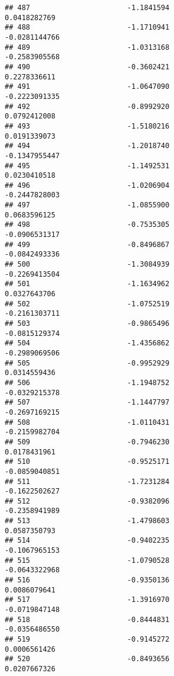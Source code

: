 \documentclass[
]{article}
\begin{document}
\begin{verbatim}
## 487                       -1.1841594                          0.0418282769
## 488                       -1.1710941                         -0.0281144766
## 489                       -1.0313168                         -0.2583905568
## 490                       -0.3602421                          0.2278336611
## 491                       -1.0647090                         -0.2223091335
## 492                       -0.8992920                          0.0792412008
## 493                       -1.5180216                          0.0191339073
## 494                       -1.2018740                         -0.1347955447
## 495                       -1.1492531                          0.0230410518
## 496                       -1.0206904                         -0.2447828003
## 497                       -1.0855900                          0.0683596125
## 498                       -0.7535305                         -0.0906531317
## 499                       -0.8496867                         -0.0842493336
## 500                       -1.3084939                         -0.2269413504
## 501                       -1.1634962                          0.0327643706
## 502                       -1.0752519                         -0.2161303711
## 503                       -0.9865496                         -0.0815129374
## 504                       -1.4356862                         -0.2989069506
## 505                       -0.9952929                          0.0314559436
## 506                       -1.1948752                         -0.0329215378
## 507                       -1.1447797                         -0.2697169215
## 508                       -1.0110431                         -0.2159982704
## 509                       -0.7946230                          0.0178431961
## 510                       -0.9525171                         -0.0859040851
## 511                       -1.7231284                         -0.1622502627
## 512                       -0.9382096                         -0.2358941989
## 513                       -1.4798603                          0.0587350793
## 514                       -0.9402235                         -0.1067965153
## 515                       -1.0790528                         -0.0643322968
## 516                       -0.9350136                          0.0086079641
## 517                       -1.3916970                         -0.0719847148
## 518                       -0.8444831                         -0.0356486550
## 519                       -0.9145272                          0.0006561426
## 520                       -0.8493656                          0.0207667326

\end{verbatim}
\end{document}
